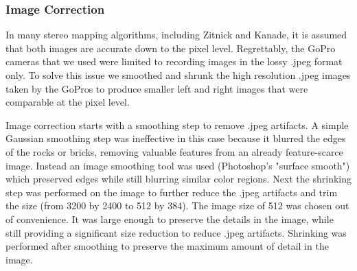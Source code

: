 \documentclass[a4paper,twoside]{article}
\begin{document}
\subsubsection{Image Correction}
\label{subsec:image_correction}

In many stereo mapping algorithms, including Zitnick and Kanade, it is assumed that both images are accurate down to the pixel level.
Regrettably, the GoPro cameras that we used were limited to recording images in the lossy .jpeg format only.
To solve this issue we smoothed and shrunk the high resolution .jpeg images taken by the GoPros to produce smaller left and right images that were comparable at the pixel level.

Image correction starts with a smoothing step  to remove .jpeg artifacts.
  A simple Gaussian smoothing step was ineffective in this case because it blurred the edges of the rocks or bricks, removing valuable features from an already feature-scarce image.
  Instead an image smoothing tool was used (Photoshop's "surface smooth") which preserved edges while still blurring similar color regions.
  Next the shrinking step was performed on the image to further reduce the .jpeg artifacts and trim the size (from 3200 by 2400 to 512 by 384).
The image size of 512 was chosen out of convenience.  It was large enough to preserve the details in the image, while still providing a significant size reduction to reduce .jpeg artifacts.   
Shrinking was performed after smoothing to preserve the maximum amount of detail in the image.  

\end{document}
